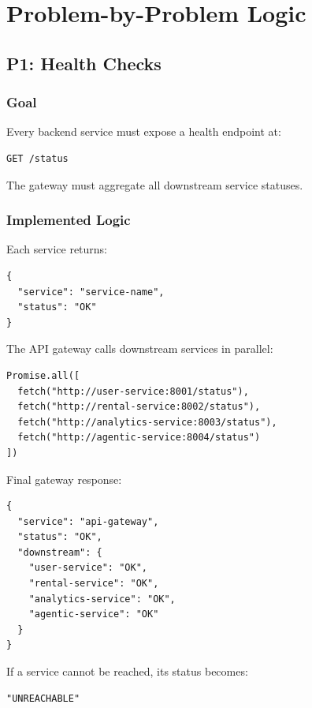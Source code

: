 \documentclass[11pt,a4paper]{article}
\begin{document}
\newpage
\section{Problem-by-Problem Logic}

\subsection{P1: Health Checks}

\subsubsection*{Goal}
Every backend service must expose a health endpoint at:

\begin{lstlisting}
GET /status
\end{lstlisting}

The gateway must aggregate all downstream service statuses.

\subsubsection*{Implemented Logic}

Each service returns:

\begin{lstlisting}
{
  "service": "service-name",
  "status": "OK"
}
\end{lstlisting}

The API gateway calls downstream services in parallel:

\begin{lstlisting}
Promise.all([
  fetch("http://user-service:8001/status"),
  fetch("http://rental-service:8002/status"),
  fetch("http://analytics-service:8003/status"),
  fetch("http://agentic-service:8004/status")
])
\end{lstlisting}

Final gateway response:

\begin{lstlisting}
{
  "service": "api-gateway",
  "status": "OK",
  "downstream": {
    "user-service": "OK",
    "rental-service": "OK",
    "analytics-service": "OK",
    "agentic-service": "OK"
  }
}
\end{lstlisting}

If a service cannot be reached, its status becomes:

\begin{lstlisting}
"UNREACHABLE"
\end{lstlisting}
\end{document}
